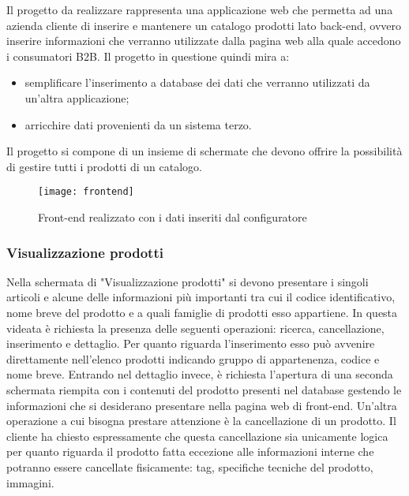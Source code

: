 Il progetto da realizzare rappresenta una applicazione web che permetta ad una azienda cliente di inserire e mantenere un catalogo prodotti lato back-end, ovvero inserire informazioni che verranno utilizzate dalla pagina web alla quale accedono i consumatori B2B. 
Il progetto in questione quindi mira a:
\begin{itemize}
	\item semplificare l'inserimento a database dei dati che verranno utilizzati da un'altra applicazione;
	\item arricchire dati provenienti da un sistema terzo.
\end{itemize}

Il progetto si compone di un insieme di schermate che devono offrire la possibilità di gestire tutti i prodotti di un catalogo. 


\begin{figure}[!h] 
	\centering 
	\texttt{[image: frontend]} 
	\caption{Front-end realizzato con i dati inseriti dal configuratore}
	\label{ImgFrontend}
\end{figure}

\subsubsection{Visualizzazione prodotti}
Nella schermata di "Visualizzazione prodotti" si devono presentare i singoli articoli e alcune delle informazioni più importanti tra cui il codice identificativo, nome breve del prodotto e a quali famiglie di prodotti esso appartiene. In questa videata è richiesta la presenza delle seguenti operazioni: ricerca, cancellazione, inserimento e dettaglio.
Per quanto riguarda l'inserimento esso può avvenire direttamente nell'elenco prodotti indicando gruppo di appartenenza, codice e nome breve.
Entrando nel dettaglio invece, è richiesta l'apertura di una seconda schermata riempita con i contenuti del prodotto presenti nel database gestendo le informazioni che si desiderano presentare nella pagina web di front-end.
Un'altra operazione a cui bisogna prestare attenzione è la cancellazione di un prodotto. Il cliente ha chiesto espressamente che questa cancellazione sia unicamente logica per quanto riguarda il prodotto fatta eccezione alle informazioni interne che potranno essere cancellate fisicamente: tag, specifiche tecniche del prodotto, immagini.

